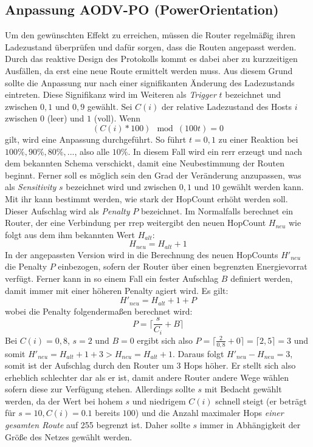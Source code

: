 \subsection{Anpassung AODV-PO (PowerOrientation)}
\label{chapter:versuch:aufbau:anpassungen-aodv}

Um den gewünschten Effekt zu erreichen, müssen die Router regelmäßig ihren Ladezustand überprüfen und dafür sorgen, dass die Routen angepasst werden. Durch das reaktive Design des Protokolls kommt es dabei aber zu kurzzeitigen Ausfällen, da erst eine neue Route ermittelt werden muss. Aus diesem Grund sollte die Anpassung nur nach einer signifikanten Änderung des Ladezustands eintreten. Diese Signifikanz wird im Weiteren als \textit{Trigger} $t$ bezeichnet und zwischen $0{,}1$ und $0{,}9$ gewählt. Sei $C(i)$ der relative Ladezustand des Hosts $i$ zwischen $0$ (leer) und $1$ (voll). Wenn \begin{displaymath}
(C(i) * 100) \mod (100t) = 0
\end{displaymath} 
gilt, wird eine Anpassung durchgeführt. So führt \zB $t=0{,}1$ zu einer Reaktion bei $100\%,90\%,80\%, ...$, also alle $10\%$. In diesem Fall wird ein \gls{rerr} erzeugt und nach dem bekannten Schema verschickt, damit eine Neubestimmung der Routen beginnt. Ferner soll es möglich sein den Grad der Veränderung anzupassen, was als \textit{Sensitivity} $s$ bezeichnet wird und zwischen $0{,}1$ und $10$ gewählt werden kann. Mit ihr kann bestimmt werden, wie stark der HopCount erhöht werden soll. Dieser Aufschlag wird als \textit{Penalty} $P$ bezeichnet. Im Normalfalls berechnet ein Router, der eine Verbindung per \gls{rrep} weitergibt den neuen HopCount $H_{neu}$ wie folgt aus dem ihm bekannten Wert $H_{alt}$:
\begin{displaymath}
H_{neu} = H_{alt} + 1
\end{displaymath}
In der angepassten Version wird in die Berechnung des neuen HopCounts $H'_{neu}$ die Penalty $P$ einbezogen, sofern der Router über einen begrenzten Energievorrat verfügt. Ferner kann in so einem Fall ein fester Aufschlag $B$ definiert werden, damit immer mit einer höheren Penalty agiert wird. Es gilt:
\begin{displaymath}
H'_{neu} = H_{alt} + 1 + P
\end{displaymath}
wobei die Penalty folgendermaßen berechnet wird:
\begin{displaymath}
P = \lceil\frac{s}{C_i} + B\rceil
\end{displaymath}
Bei $C(i) = 0{,}8$, $s = 2$ und $B=0$ ergibt sich also $P=\lceil\frac{2}{0{,}8} + 0\rceil = \lceil2{,}5\rceil = 3$ und somit $H'_{neu} = H_{alt} + 1 + 3 > H_{neu} = H_{alt} + 1$. Daraus folgt $H'_{neu} - H_{neu} = 3$, somit ist der Aufschlag durch den Router um 3 Hops höher. Er stellt sich also erheblich schlechter dar als er ist, damit andere Router \ggf andere Wege wählen sofern diese zur Verfügung stehen. Allerdings sollte $s$ mit Bedacht gewählt werden, da der Wert bei hohem $s$ und niedrigem $C(i)$ schnell steigt (er beträgt \zB für $s=10, C(i)=0.1$ bereits $100$) und die Anzahl maximaler Hops \textit{einer gesamten Route} auf 255 begrenzt ist. Daher sollte $s$ immer in Abhängigkeit der Größe des Netzes gewählt werden.\newline

